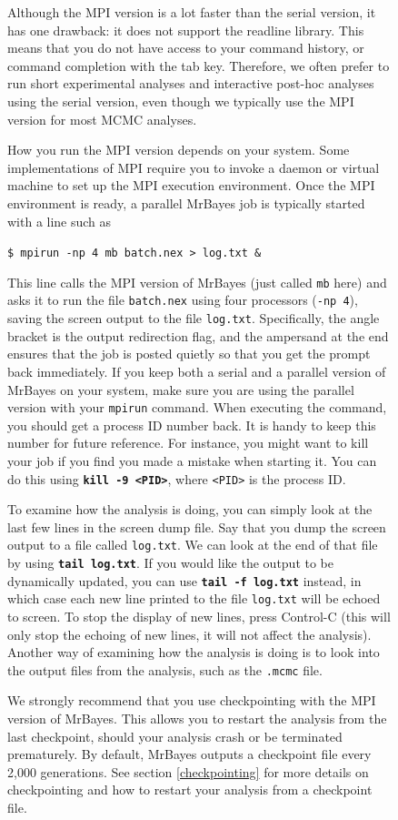 \documentclass[12pt]{book}
\newcommand{\ttt}[1]{\texttt{#1}}
\newcommand{\tb}[1]{\ttt{\textbf{#1}}}
\begin{document}
\begin{figure}[h]
Although the MPI version is a lot faster than the serial version, it has one drawback: it does not
support the readline library. This means that you do not have access to your command history, or
command completion with the tab key. Therefore, we often prefer to run short experimental analyses
and interactive post-hoc analyses using the serial version, even though we typically use the MPI
version for most MCMC analyses.

How you run the MPI version depends on your system. Some implementations of MPI require you to
invoke a daemon or virtual machine to set up the MPI execution environment. Once the MPI
environment is ready, a parallel MrBayes job is typically started with a line such as

\ttt{\$ mpirun -np 4 mb batch.nex > log.txt \&}

This line calls the MPI version of MrBayes (just called \ttt{mb} here) and asks it to run the file
\ttt{batch.nex} using four processors (\ttt{-np 4}), saving the screen output to the file
\ttt{log.txt}. Specifically, the angle bracket is the output redirection flag, and the ampersand at
the end ensures that the job is posted quietly so that you get the prompt back immediately. If you
keep both a serial and a parallel version of MrBayes on your system, make sure you are using the
parallel version with your \ttt{mpirun} command. When executing the command, you should get a
process ID number back. It is handy to keep this number for future reference. For instance, you
might want to kill your job if you find you made a mistake when starting it. You can do this using
\tb{kill -9 <PID>}, where \ttt{<PID>} is the process ID.

To examine how the analysis is doing, you can simply look at the last few lines in the screen dump
file. Say that you dump the screen output to a file called \ttt{log.txt}. We can look at the end of
that file by using \tb{tail log.txt}. If you would like the output to be dynamically updated, you
can use \tb{tail -f log.txt} instead, in which case each new line printed to the file \ttt{log.txt}
will be echoed to screen. To stop the display of new lines, press Control-C (this will only stop
the echoing of new lines, it will not affect the analysis). Another way of examining how the
analysis is doing is to look into the output files from the analysis, such as the \ttt{.mcmc} file.

We strongly recommend that you use checkpointing with the MPI version of MrBayes. This allows you
to restart the analysis from the last checkpoint, should your analysis crash or be terminated
prematurely. By default, MrBayes outputs a checkpoint file every 2,000 generations. See section
\ref{checkpointing} for more details on checkpointing and how to restart your analysis from a
checkpoint file.



\end{figure}
\end{document}

